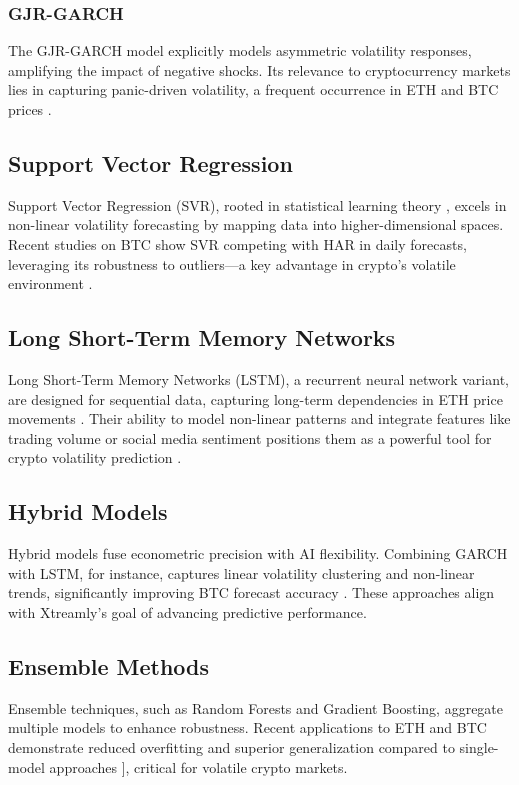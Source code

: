 \documentclass[9pt]{article}
\begin{document}
\begin{multicols}{2}
		\subsubsection{GJR-GARCH}
		The GJR-GARCH model \citep{glosten1993} explicitly models asymmetric volatility responses, amplifying the impact of negative shocks. Its relevance to cryptocurrency markets lies in capturing panic-driven volatility, a frequent occurrence in ETH and BTC prices \citep{brooks2019}.
		
		\subsection{Support Vector Regression}
		Support Vector Regression (SVR), rooted in statistical learning theory \citep{cortes1995}, excels in non-linear volatility forecasting by mapping data into higher-dimensional spaces. Recent studies on BTC show SVR competing with HAR in daily forecasts, leveraging its robustness to outliers—a key advantage in crypto’s volatile environment \citep{kim2021}.
		
		\subsection{Long Short-Term Memory Networks}
		Long Short-Term Memory Networks (LSTM), a recurrent neural network variant, are designed for sequential data, capturing long-term dependencies in ETH price movements \citep{islam2020}. Their ability to model non-linear patterns and integrate features like trading volume or social media sentiment positions them as a powerful tool for crypto volatility prediction \citep{chen2023}.
		
		\subsection{Hybrid Models}
		Hybrid models fuse econometric precision with AI flexibility. Combining GARCH with LSTM, for instance, captures linear volatility clustering and non-linear trends, significantly improving BTC forecast accuracy \citep{zoumpekas2022, chen2023}. These approaches align with Xtreamly’s goal of advancing predictive performance.
		
		\subsection{Ensemble Methods}
		Ensemble techniques, such as Random Forests and Gradient Boosting, aggregate multiple models to enhance robustness. Recent applications to ETH and BTC demonstrate reduced overfitting and superior generalization compared to single-model approaches \citep{bara2024, li2022}], critical for volatile crypto markets.
		

\end{multicols}
\end{document}
